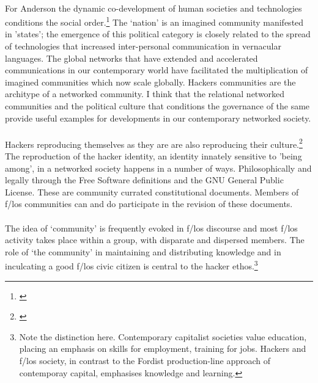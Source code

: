 \paragraph{}For Anderson the dynamic co-development of human societies and technologies conditions the social order.\footnote{\cite{Anderson:1991ic}} The `nation' is an imagined community manifested in 'states'; the emergence of this political category is closely related to the spread of technologies that increased inter-personal communication in vernacular languages. The global networks that have extended and accelerated communications in our contemporary world have facilitated the multiplication of imagined communities which now scale globally. Hackers communities are the architype of a networked community. I think that the relational networked communities and the political culture that conditions the governance of the same provide useful examples for developments in our contemporary networked society.

\paragraph{}Hackers reproducing themselves as they are are also reproducing their culture.\footnote{\cite{Appadurai:1996lp}} The reproduction of the hacker identity, an identity innately sensitive to 'being among', in a networked society happens in a number of ways. Philosophically and legally through the Free Software definitions and the GNU General Public License. These are community currated constitutional documents. Members of f/los communities can and do participate in the revision of these documents.

\paragraph{}The idea of `community' is frequently evoked in f/los discourse and most f/los activity takes place within a group, with disparate and dispersed members. The role of `the community' in maintaining and distributing knowledge and in inculcating a good f/los civic citizen is central to the hacker ethos.\footnote{Note the distinction here. Contemporary capitalist societies value education, placing an emphasis on skills for employment, training for jobs. Hackers and f/los society, in contrast to the Fordist production-line approach of contemporay capital, emphasises knowledge and learning.}